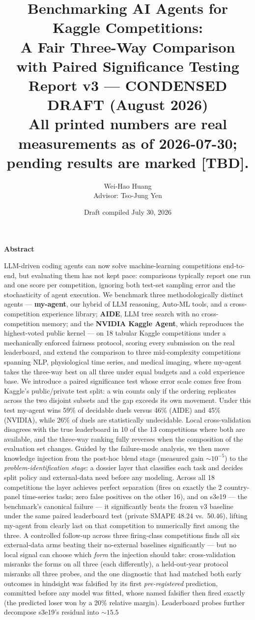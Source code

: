\documentclass[11pt,a4paper]{article}
\title{\textbf{Benchmarking AI Agents for Kaggle Competitions:\\
A Fair Three-Way Comparison with Paired Significance Testing}\\
\large Report v3 --- CONDENSED DRAFT (August 2026)\\
\normalsize\textcolor{orange!85!black}{All printed numbers are real measurements as of 2026-07-30; pending results are marked [TBD].}}
\author{Wei-Hao Huang\\\small Advisor: Tso-Jung Yen}
\date{Draft compiled July 30, 2026}
\begin{document}
\maketitle

\begin{center}\textbf{\large Abstract}\end{center}
\noindent LLM-driven coding agents can now solve machine-learning competitions end-to-end, but evaluating them has not kept pace: comparisons typically report one run and one score per competition, ignoring both test-set sampling error and the stochasticity of agent execution. We benchmark three methodologically distinct agents --- \textbf{my-agent}, our hybrid of LLM reasoning, Auto-ML tools, and a cross-competition experience library; \textbf{AIDE}, LLM tree search with no cross-competition memory; and the \textbf{NVIDIA Kaggle Agent}, which reproduces the highest-voted public kernel --- on 18 tabular Kaggle competitions under a mechanically enforced fairness protocol, scoring every submission on the real leaderboard, and extend the comparison to three mid-complexity competitions spanning NLP, physiological time series, and medical imaging, where my-agent takes the three-way best on all three under equal budgets and a cold experience base. We introduce a paired significance test whose error scale comes free from Kaggle's public/private test split: a win counts only if the ordering replicates across the two disjoint subsets and the gap exceeds its own movement. Under this test my-agent wins 59\% of decidable duels versus 46\% (AIDE) and 45\% (NVIDIA), while 26\% of duels are statistically undecidable. Local cross-validation disagrees with the true leaderboard in 10 of the 13 competitions where both are available, and the three-way ranking fully reverses when the composition of the evaluation set changes. Guided by the failure-mode analysis, we then move knowledge injection from the post-hoc blend stage (measured gain ${\sim}10^{-5}$) to the \emph{problem-identification stage}: a dossier layer that classifies each task and decides split policy and external-data need before any modeling. Across all 18 competitions the layer achieves perfect separation (fires on exactly the 2 country-panel time-series tasks; zero false positives on the other 16), and on s3e19 --- the benchmark's canonical failure --- it significantly beats the frozen v3 baseline under the same paired leaderboard test (private SMAPE 48.24 vs.\ 50.46), lifting my-agent from clearly last on that competition to numerically first among the three. A controlled follow-up across three firing-class competitions finds all six external-data arms beating their no-external baselines significantly --- but no local signal can choose which \emph{form} the injection should take: cross-validation misranks the forms on all three (each differently), a held-out-year protocol misranks all three probes, and the one diagnostic that had matched both early outcomes in hindsight was falsified by its first \emph{pre-registered} prediction, committed before any model was fitted, whose named falsifier then fired exactly (the predicted loser won by a 20\% relative margin). Leaderboard probes further decompose s3e19's residual into ${\sim}15.5$ 
\end{document}
